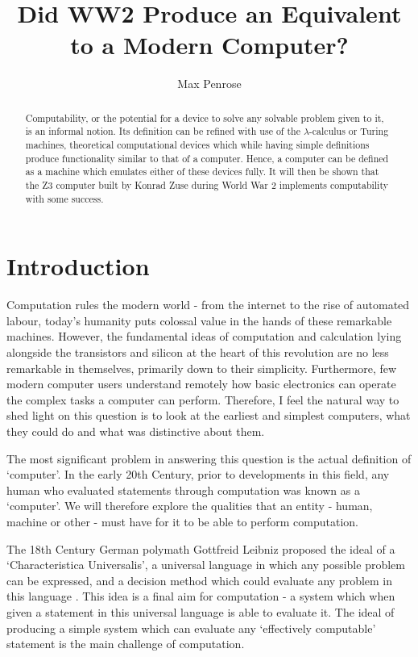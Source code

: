 \documentclass {article}
\title{Did WW2 Produce an Equivalent to a Modern Computer?}
\author{Max Penrose}
\begin{document}
\maketitle
\medskip
\medskip

\begin{abstract}
Computability, or the potential for a device to solve any solvable problem given to it, is an informal notion. Its definition can be refined with use of the $\lambda$-calculus or Turing machines, theoretical computational devices which while having simple definitions produce functionality similar to that of a computer. Hence, a computer can be defined as a machine which emulates either of these devices fully. It will then be shown that the Z3 computer built by Konrad Zuse during World War 2 implements computability with some success.
\end{abstract}

\section*{Introduction} 
Computation rules the modern world - from the internet to the rise of automated labour, today's humanity puts colossal value in the hands of these remarkable machines. However, the fundamental ideas of computation and calculation lying alongside the transistors and silicon at the heart of this revolution are no less remarkable in themselves, primarily down to their simplicity. Furthermore, few modern computer users understand remotely how basic electronics can operate the complex tasks a computer can perform. Therefore, I feel the natural way to shed light on this question is to look at the earliest and simplest computers, what they could do and what was distinctive about them.

The most significant problem in answering this question is the actual definition of `computer'. In the early 20th Century, prior to developments in this field, any human who evaluated statements through computation was known as a `computer'. We will therefore explore the qualities that an entity - human, machine or other - must have for it to be able to perform computation.

The 18th Century German polymath Gottfreid Leibniz proposed the ideal of a `Characteristica Universalis', a universal language in which any possible problem can be expressed, and a decision method which could evaluate any problem in this language \cite{barendregt1984introduction}. This idea is a final aim for computation - a system which when given a statement in this universal language is able to evaluate it. The ideal of producing a simple system which can evaluate any `effectively computable' statement is the main challenge of computation.
\end{document}
